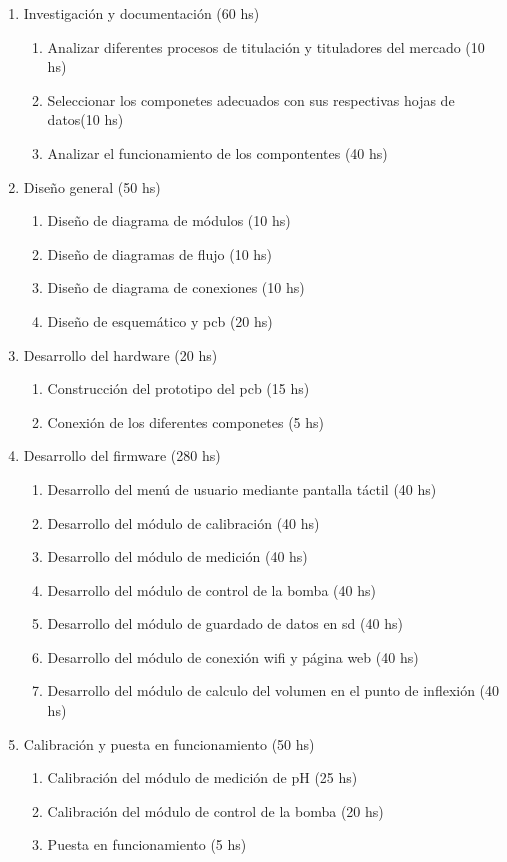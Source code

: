 \documentclass[11pt]{charter}
\begin{document}
\begin{enumerate}
\item Investigación y documentación (60 hs)
	\begin{enumerate}
	\item Analizar diferentes procesos de titulación y tituladores del mercado (10 hs)
	\item Seleccionar los componetes adecuados con sus respectivas hojas de datos(10 hs)
	\item Analizar el funcionamiento de los compontentes (40 hs)
	\end{enumerate}
\item Diseño general (50 hs)
	\begin{enumerate}
	\item Diseño de diagrama de módulos (10 hs)
	\item Diseño de diagramas de flujo (10 hs)
	\item Diseño de diagrama de conexiones (10 hs)
	\item Diseño de esquemático y pcb (20 hs)
	\end{enumerate}
\item Desarrollo del hardware (20 hs)
	\begin{enumerate}
	\item Construcción del prototipo del pcb (15 hs)
	\item Conexión de los diferentes componetes (5 hs)
	\end{enumerate}
\item Desarrollo del firmware (280 hs)	
	\begin{enumerate}
	\item Desarrollo del menú de usuario mediante pantalla táctil (40 hs)
	\item Desarrollo del módulo de calibración (40 hs)
	\item Desarrollo del módulo de medición (40 hs)
	\item Desarrollo del módulo de control de la bomba (40 hs)
	\item Desarrollo del módulo de guardado de datos en sd (40 hs)
	\item Desarrollo del módulo de conexión wifi y página web (40 hs)
	\item Desarrollo del módulo de calculo del volumen en el punto de inflexión (40 hs)
	\end{enumerate}
\item Calibración y puesta en funcionamiento (50 hs)
	\begin{enumerate}	
	\item Calibración del módulo de medición de pH (25 hs)
	\item Calibración del módulo de control de la bomba (20 hs)
	\item Puesta en funcionamiento  (5 hs)
	\end{enumerate}
	

\end{enumerate}
\end{document}
